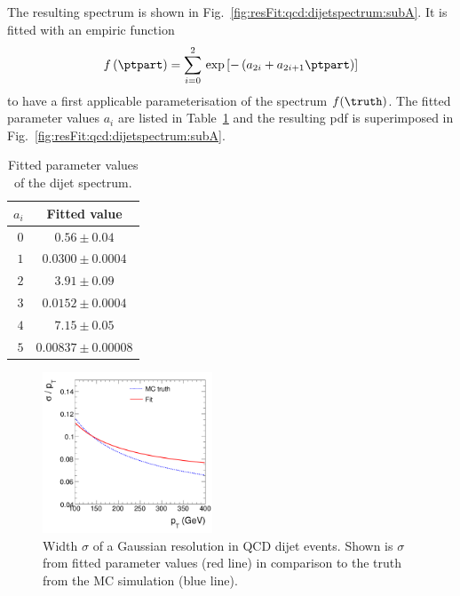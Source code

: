 \documentclass[a4paper]{cmspaper} %
\begin{document}
The resulting \ptpart spectrum is shown in Fig.~\ref{fig:resFit:qcd:dijetspectrum:subA}.
It is fitted with an empiric function
\begin{equation}
  \label{eq:resFit:qcd:ptGenSpectrum}
  f\left(\ptpart\right) = \sum^{2}_{i=0}\,\exp\left[-\left(a_{2i} + a_{2i+1}\ptpart\right)\right]
\end{equation}
to have a first applicable parameterisation of the spectrum $f(\truth)$.
The fitted parameter values $a_{i}$ are listed in Table~\ref{tab:resFit:qcd:dijetspectrum} and the resulting pdf is superimposed in Fig.~\ref{fig:resFit:qcd:dijetspectrum:subA}.
\begin{table}[ht]
  \centering
  \begin{tabular}{rc}
    \hline
    \hline
    $a_{i}$ & Fitted value \\
    \hline
    $0$ & $0.56 \pm 0.04$ \\
    $1$ & $0.0300 \pm 0.0004$ \\
    $2$ & $3.91 \pm 0.09$ \\
    $3$ & $0.0152 \pm 0.0004$ \\
    $4$ & $7.15 \pm 0.05$ \\
    $5$ & $0.00837 \pm 0.00008$ \\
    \hline
    \hline
  \end{tabular}
 \caption{Fitted parameter values of the dijet \ptpart spectrum.}
  \label{tab:resFit:qcd:dijetspectrum}
\end{table}

\begin{figure}[ht]
  \centering
  \includegraphics[width=0.45\textwidth]{figures/resFit_PtDependentSigma}
  \caption{Width $\sigma$ of a Gaussian resolution in QCD dijet events. Shown is $\sigma$ from fitted parameter values (red line) in comparison to the truth from the MC simulation (blue line).}
  \label{fig:resFit:qcd:ptDependentSigma}
\end{figure}
\end{document}
